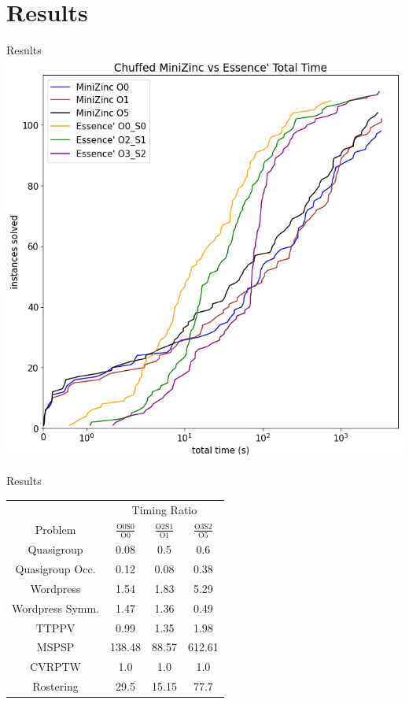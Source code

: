 \documentclass{beamer}
\begin{document}
\section*{Results}
\begin{frame}{Results}
\includegraphics{../python/graphs/paper_total_cactus.png}
\end{frame}

\begin{frame}{Results}
{\footnotesize{

\begin{table}[h!]
    \centering
    \begin{tabular}{c|ccc}
    & \multicolumn{3}{c}{Timing Ratio} \\
    Problem & $\frac{\text{O0S0}}{\text{O0}}$ & $\frac{\text{O2S1}}{\text{O1}}$ & $\frac{\text{O3S2}}{\text{O5}}$ \\ \hline
    Quasigroup           & 0.08      & 0.5       & 0.6   \\        
    Quasigroup Occ.      & 0.12      & 0.08      & 0.38  \\
    Wordpress            & 1.54      & 1.83      & 5.29  \\               
    Wordpress Symm.      & 1.47      & 1.36      & 0.49  \\ 
    TTPPV                & 0.99      & 1.35      & 1.98  \\ 
    MSPSP                & 138.48    & 88.57     & 612.61\\ 
    CVRPTW               & 1.0       & 1.0       & 1.0   \\ 
    Rostering            & 29.5      & 15.15     & 77.7   
    \end{tabular}
\end{table}}}
\end{frame}
    
\end{document}
